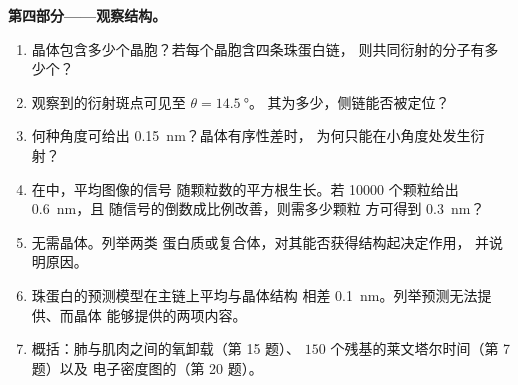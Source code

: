 \begin{problem}
\medskip
\noindent\textbf{第四部分——观察结构。}
\begin{enumerate}[resume]
  \item 晶体包含多少个晶胞？若每个晶胞含四条珠蛋白链，
        则共同衍射的分子有多少个？
  \item 观察到的衍射斑点可见至 $\theta = \qty{14.5}{\degree}$。
        其为多少，侧链能否被定位？
  \item 何种角度可给出 \qty{0.15}{nm}？晶体有序性差时，
        为何只能在小角度处发生衍射？
  \item 在中，平均图像的信号
        随颗粒数的平方根生长。若
        \num{10000} 个颗粒给出 \qty{0.6}{nm}，且
        随信号的倒数成比例改善，则需多少颗粒
        方可得到 \qty{0.3}{nm}？
  \item {}无需晶体。列举两类
        蛋白质或复合体，对其能否获得结构起决定作用，
        并说明原因。
  \item 珠蛋白的预测模型在主链上平均与晶体结构
        相差 \qty{0.1}{nm}。列举预测无法提供、而晶体
        能够提供的两项内容。
  \item 概括：肺与肌肉之间的氧卸载（第 15 题）、
        $150$ 个残基的莱文塔尔时间（第 7 题）以及
        电子密度图的（第 20 题）。
\end{enumerate}
\end{problem}

